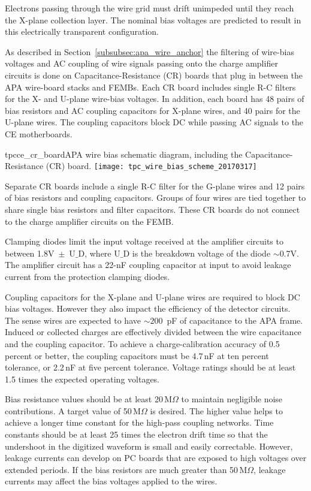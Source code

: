 Electrons passing through the wire grid must drift unimpeded until they reach the X-plane 
collection layer. The nominal bias voltages are predicted to result in this electrically 
transparent configuration.

As described in Section~\ref{subsubsec:apa_wire_anchor}
 the filtering of wire-bias voltages and AC coupling of wire signals passing
onto the charge amplifier circuits is done on Capacitance-Resistance (CR) boards that plug in between the APA wire-board stacks and FEMBs.
Each CR board includes single R-C filters for the X- and U-plane wire-bias voltages. In addition, each board has 48 
pairs of bias resistors and AC coupling capacitors for X-plane wires, and 40 pairs for the U-plane wires. The coupling capacitors block DC while passing AC 
signals to the CE motherboards.

\begin{cdrfigure}{tpcce_cr_board}{APA wire bias 
schematic diagram, including the Capacitance-Resistance (CR) board.}
\texttt{[image: tpc\_wire\_bias\_scheme\_20170317]}
\end{cdrfigure}

Separate CR boards include a single R-C filter for the G-plane wires and 12 pairs of bias resistors and
coupling capacitors.
Groups of four wires are tied together to share single
bias resistors and filter capacitors. These CR boards do not connect to the charge amplifier circuits on the FEMB.

Clamping diodes limit the input voltage received at the amplifier circuits to between 1.8V~$\pm$~U$\_$D, where U$\_$D
is the breakdown voltage of the diode $\sim$0.7V.
The amplifier circuit has a 22-nF coupling capacitor at input to avoid leakage current from the protection clamping diodes. 

Coupling capacitors for the X-plane and U-plane wires are required to block DC bias voltages.
However they also impact the efficiency of the detector circuits.
The sense wires are expected to have $\sim200$~pF of capacitance to the APA frame.
Induced or collected charges are effectively divided between the wire capacitance and the coupling capacitor.
To achieve a charge-calibration accuracy of 0.5 percent or better,
the coupling capacitors must be 4.7\,nF at ten percent tolerance, or 2.2\,nF at five percent tolerance.
Voltage ratings should be at least 1.5 times the expected operating voltages.

Bias resistance values should be at least 20\,M$\Omega$ to maintain negligible noise contributions.
A target value of 50\,M$\Omega$ is desired.
The higher value helps to achieve a longer time constant for the high-pass coupling networks.
Time constants should be at least 25 times the electron drift time so that the undershoot in the digitized waveform
is small and easily correctable.
However, leakage currents can develop on PC boards that are exposed to high voltages over extended periods.
If the bias resistors are much greater than 50\,M$\Omega$, leakage currents may affect the bias voltages applied to the wires.

